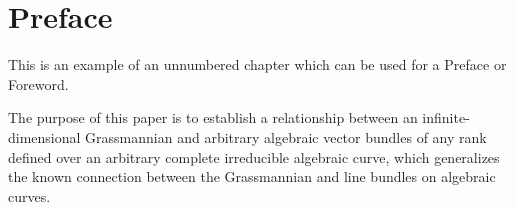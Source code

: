 %

\chapter*{Preface}

This is an example of an unnumbered chapter which can be used for a Preface
or Foreword.

The purpose of this paper is to establish a relationship between an
infinite-dimensional Grassmannian and arbitrary algebraic vector bundles
of any rank defined over an arbitrary complete irreducible algebraic
curve, which generalizes the known connection between the Grassmannian
and line bundles on algebraic curves.


